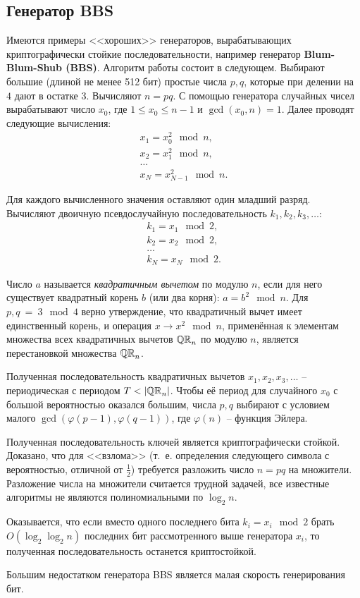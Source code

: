 \subsection{Генератор BBS}

Имеются примеры <<хороших>> генераторов, вырабатывающих криптографически стойкие последовательности, например генератор \textbf{Blum-Blum-Shub (BBS)}. Алгоритм работы состоит в следующем. Выбирают большие (длиной не менее 512 бит) простые числа $p, q$, которые при делении на $4$ дают в остатке $3$. Вычисляют $n = p q$. С помощью генератора случайных чисел вырабатывают число $x_{0}$, где $1 \leq x_0 \leq n-1$ и $\gcd(x_0, n) = 1$. Далее проводят следующие вычисления:
\[ \begin{array}{l}
        x_{1} = x_{0}^{2} \mod n,\\
        x_{2} = x_{1}^{2} \mod n,\\
        \dots\\
        x_{N} = x_{N-1}^{2} \mod n.
\end{array} \]

Для каждого вычисленного значения оставляют один младший разряд. Вычисляют двоичную псевдослучайную последовательность $k_1, k_2, k_3, \dots$:
\[ \begin{array}{l}
        k_{1} = x_{1} \mod 2,\\
        k_{2} = x_{2} \mod 2,\\
        \dots \\
        k_{N} = x_{N} \mod 2.
\end{array} \]

Число $a$ называется \emph{квадратичным вычетом} по модулю $n$, если для него существует квадратный корень $b$ (или два корня): $a = b^2 \mod n$. Для $p,q ~=~ 3 \mod 4$ верно утверждение, что квадратичный вычет имеет единственный корень, и операция $x \rightarrow x^2 \mod n$, применённая к элементам множества всех квадратичных вычетов $\mathbb{QR}_n$ по модулю $n$, является перестановкой множества $\mathbb{QR}_n$.

Полученная последовательность квадратичных вычетов $x_1, x_2, x_3, \dots$ -- периодическая с периодом $T < |\mathbb{QR}_n|$. Чтобы её период для случайного $x_0$ с большой вероятностью оказался большим, числа $p,q$ выбирают с условием малого $\gcd(\varphi(p-1), \varphi(q-1))$, где $\varphi(n)$ -- функция Эйлера.

Полученная последовательность ключей является криптографически стойкой. Доказано, что для <<взлома>> (т.~е. определения следующего символа с вероятностью, отличной от $\frac{1}{2}$) требуется разложить число $n=pq$ на множители. Разложение числа на множители считается трудной задачей, все известные алгоритмы не являются полиномиальными по $\log_2 n$.

Оказывается, что если вместо одного последнего бита $k_i = x_i \mod 2$ брать $O(\log_2 \log_2 n)$ последних бит рассмотренного выше генератора $x_i$, то полученная последовательность останется криптостойкой.

Большим недостатком генератора BBS является малая скорость генерирования бит.
